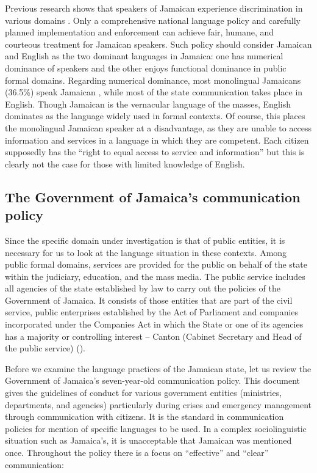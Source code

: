 \documentclass[output=paper,colorlinks,citecolor=brown]{langscibook}
\begin{document}
\begin{sloppypar}
Previous research shows that speakers of Jamaican experience discrimination in various domains \citep{Linton-PhilpFrench2001,Brown-Blake2011,Walters2016}. Only a comprehensive national language policy and carefully planned implementation and enforcement can achieve fair, humane, and courteous treatment for Jamaican speakers. Such policy should consider Jamaican and English as the two dominant languages in Jamaica: one has numerical dominance of speakers and the other enjoys functional dominance in public formal domains. Regarding numerical dominance, most monolingual Jamaicans (36.5\%) speak Jamaican \citep{JamaicanLanguageUnit2006}, while most of the state communication takes place in English. Though Jamaican is the vernacular language of the masses, English dominates as the language widely used in formal contexts. Of course, this places the monolingual Jamaican speaker at a disadvantage, as they are unable to access information and services in a language in which they are competent. Each citizen supposedly has the “right to equal access to service and information” \citep[2]{Ministry_of_CommerceScience_and_Technology2003} but this is clearly not the case for those with limited knowledge of English.
\end{sloppypar}

\subsection{The Government of Jamaica’s communication policy}

Since the specific domain under investigation is that of public entities, it is necessary for us to look at the language situation in these contexts. Among public formal domains, services are provided for the public on behalf of the state within the judiciary, education, and the mass media. The public service includes all agencies of the state established by law to carry out the policies of the Government of Jamaica. It consists of those entities that are part of the civil service, public enterprises established by the Act of Parliament and companies incorporated under the Companies Act in which the State or one of its agencies has a majority or controlling interest – Canton \citeauthor{Davis2001} (Cabinet Secretary and Head of the public service) (\citeyear{Davis2001}). 

Before we examine the language practices of the Jamaican state, let us review the Government of Jamaica’s seven-year-old communication policy. This document gives the guidelines of conduct for various government entities (ministries, departments, and agencies) particularly during crises and emergency management through communication with citizens. It is the standard in communication policies for mention of specific languages to be used. In a complex sociolinguistic situation such as Jamaica’s, it is unacceptable that Jamaican was mentioned once. Throughout the policy there is a focus on “effective” and “clear” communication: 
\end{document}
